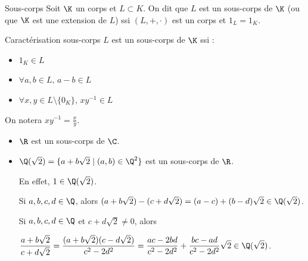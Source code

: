 \begin{definition}{Sous-corps}{}
    Soit $\K$ un corps et $L \subset K$. On dit que $L$ est un sous-corps de $\K$ (ou 
    que $\K$ est une extension de $L$) ssi $(L, +, \cdot)$ est un corps et 
    $1_L = 1_K$.
\end{definition}


\begin{proposition}{Caractérisation sous-corps}{}
    $L$ est un sous-corps de $\K$ ssi :
    \begin{itemize}
        \item $1_K \in L$
        \item $\forall a, b \in L, \, a - b \in L$
        \item $\forall x, y \in L\setminus \{0_K\}, \, xy^{-1} \in L$
    \end{itemize}
\end{proposition}

\begin{remarque}
    On notera $xy^{-1} = \frac x y$. 
\end{remarque}

\begin{exemple}
    \begin{itemize}
        \item $\R$ est un sous-corps de $\C$.

        \item $\Q(\sqrt 2) = \{a + b \sqrt 2 \mid (a, b) \in \Q^2\}$ est un sous-corps de $\R$.

        En effet, $1 \in \Q(\sqrt 2)$.

        Si $a, b, c, d \in \Q$, alors $(a + b \sqrt 2) - (c + d \sqrt 2) = (a - c) + (b - d) \sqrt 2 \in \Q(\sqrt 2)$.

        Si $a, b, c, d \in \Q$ et $c + d \sqrt 2 \neq 0$, alors 
    
        $\displaystyle \frac {a + b \sqrt 2}{c + d \sqrt 2} = \frac{(a + b \sqrt 2)(c - d \sqrt 2)}{c^2 - 2d^2} = \frac{ac - 2bd}{c^2 - 2d^2} + \frac{bc - ad}{c^2 - 2d^2} \sqrt 2 \in \Q(\sqrt 2)$.
    \end{itemize}
\end{exemple}

